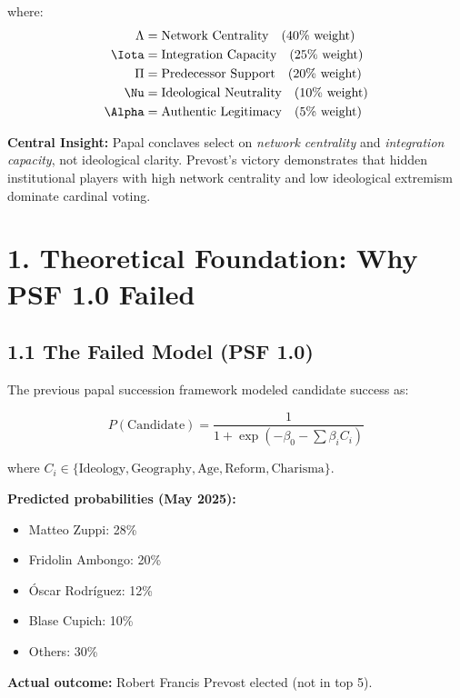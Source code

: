 where:
\begin{align*}
\Lambda &= \text{Network Centrality} \quad (40\% \text{ weight}) \\
\Iota &= \text{Integration Capacity} \quad (25\% \text{ weight}) \\
\Pi &= \text{Predecessor Support} \quad (20\% \text{ weight}) \\
\Nu &= \text{Ideological Neutrality} \quad (10\% \text{ weight}) \\
\Alpha &= \text{Authentic Legitimacy} \quad (5\% \text{ weight})
\end{align*}

\textbf{Central Insight:} Papal conclaves select on \textit{network centrality} and \textit{integration capacity}, not ideological clarity. Prevost's victory demonstrates that hidden institutional players with high network centrality and low ideological extremism dominate cardinal voting.

\section{1. Theoretical Foundation: Why PSF 1.0 Failed}

\subsection{1.1 The Failed Model (PSF 1.0)}

The previous papal succession framework modeled candidate success as:

\begin{equation}
P(\text{Candidate}) = \frac{1}{1 + \exp(-\beta_0 - \sum \beta_i C_i)}
\end{equation}

where $C_i \in \{\text{Ideology}, \text{Geography}, \text{Age}, \text{Reform}, \text{Charisma}\}$.

\textbf{Predicted probabilities (May 2025):}
\begin{itemize}
\item Matteo Zuppi: 28\%
\item Fridolin Ambongo: 20\%
\item Óscar Rodríguez: 12\%
\item Blase Cupich: 10\%
\item Others: 30\%
\end{itemize}

\textbf{Actual outcome:} Robert Francis Prevost elected (not in top 5).

